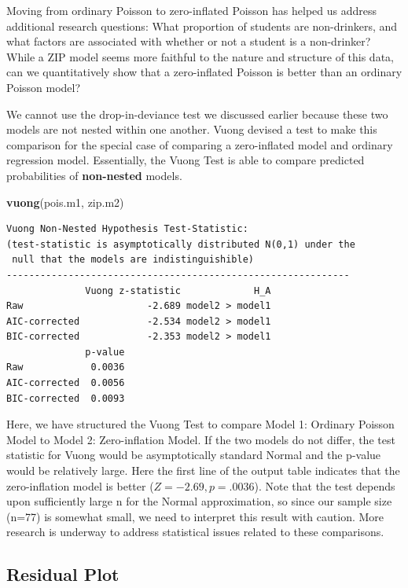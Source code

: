 \documentclass[
]{krantz}
\newenvironment{Shaded}{\begin{snugshade}}{\end{snugshade}}
\newcommand{\FunctionTok}[1]{\textcolor[rgb]{0.27,0.27,0.27}{\textbf{#1}}}
\newcommand{\NormalTok}[1]{#1}
\begin{document}
Moving from ordinary Poisson to zero-inflated Poisson has helped us address additional research questions: What proportion of students are non-drinkers, and what factors are associated with whether or not a student is a non-drinker? While a ZIP model seems more faithful to the nature and structure of this data, can we quantitatively show that a zero-inflated Poisson is better than an ordinary Poisson model?

We cannot use the drop-in-deviance test we discussed earlier because these two models are not nested within one another. Vuong \citeyearpar{Vuong1989} devised a test to make this comparison for the special case of comparing a zero-inflated model and ordinary regression model. Essentially, the Vuong Test  is able to compare predicted probabilities of \textbf{non-nested} models.

\begin{Shaded}
\begin{Highlighting}[]
\FunctionTok{vuong}\NormalTok{(pois.m1, zip.m2)}
\end{Highlighting}
\end{Shaded}

\begin{verbatim}
Vuong Non-Nested Hypothesis Test-Statistic: 
(test-statistic is asymptotically distributed N(0,1) under the
 null that the models are indistinguishible)
-------------------------------------------------------------
              Vuong z-statistic             H_A
Raw                      -2.689 model2 > model1
AIC-corrected            -2.534 model2 > model1
BIC-corrected            -2.353 model2 > model1
              p-value
Raw            0.0036
AIC-corrected  0.0056
BIC-corrected  0.0093
\end{verbatim}

Here, we have structured the Vuong Test to compare Model 1: Ordinary Poisson Model to Model 2: Zero-inflation Model. If the two models do not differ, the test statistic for Vuong would be asymptotically standard Normal and the p-value would be relatively large. Here the first line of the output table indicates that the zero-inflation model is better (\(Z=-2.69,p=.0036\)). Note that the test depends upon sufficiently large n for the Normal approximation, so since our sample size (n=77) is somewhat small, we need to interpret this result with caution. More research is underway to address statistical issues related to these comparisons.

\subsection{Residual Plot}\label{residual-plot}
\end{document}
